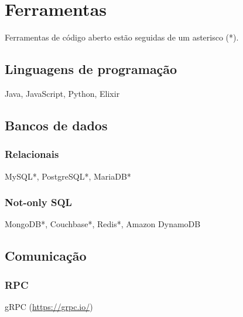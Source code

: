 \chapter{Ferramentas}\label{chapter-ferramentas}



Ferramentas de código aberto estão seguidas de um asterisco (*).

\section{Linguagens de programação}
Java, JavaScript, Python, Elixir

\section{Bancos de dados}

\subsection{Relacionais}
MySQL*, PostgreSQL*, MariaDB*

\subsection{Not-only SQL}
MongoDB*, Couchbase*, Redis*, Amazon DynamoDB

\section{Comunicação}

\subsection{RPC}
gRPC (\url{https://grpc.io/})

